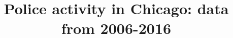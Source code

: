 \documentclass{article}
\title{Police activity in Chicago: data from 2006-2016}
\author{}
\begin{document}
\maketitle

\begin{abstract}
 \end{abstract}






\end{document}
